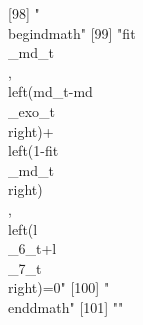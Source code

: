  [98] "\\begin{dmath}"                                                                                                                                                                                                                                                                                                                                                                                                                                                                                                                                                                                                                               
 [99] "{{fit\\_md}_{t}}\\, \\left({md_{t}}-{{md\\_exo}_{t}}\\right)+\\left(1-{{fit\\_md}_{t}}\\right)\\, \\left({{l\\_6}_{t}}+{{l\\_7}_{t}}\\right)=0"                                                                                                                                                                                                                                                                                                                                                                                                                                                                                               
[100] "\\end{dmath}"                                                                                                                                                                                                                                                                                                                                                                                                                                                                                                                                                                                                                                 
[101] ""                                                                                                                                                                                                                                                                                                                                                                                                                                                                                                                                                                                                                                             
